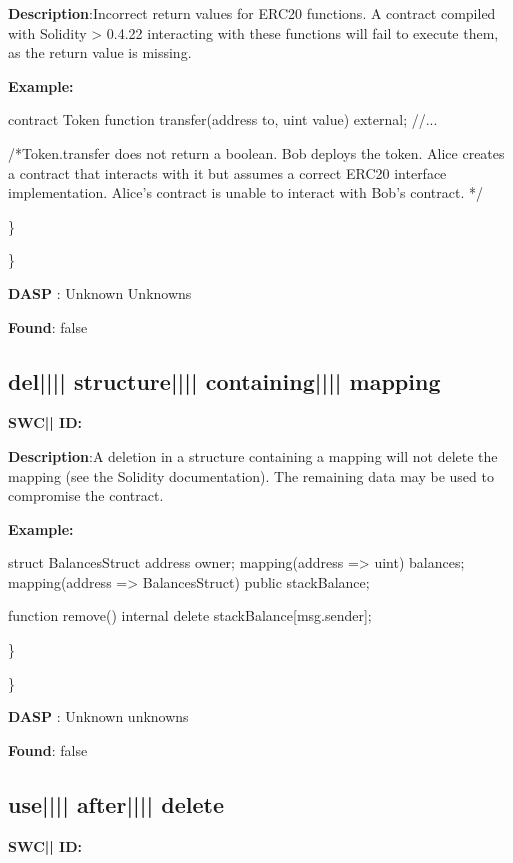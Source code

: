\documentclass{article}
\begin{document}
\textbf{Description}:Incorrect return values for ERC20 functions. A contract compiled with Solidity > 0.4.22 interacting with these functions will fail to execute them, as the return value is missing.


\textbf{Example:} 
\begin{ffcode} 

contract Token{
    function transfer(address to, uint value) external;
    //...
}

 /*Token.transfer does not return a boolean. Bob deploys the token. Alice creates a contract that interacts with it but assumes a correct ERC20 interface implementation. Alice's contract is unable to interact with Bob's contract. */ 

\end{ffcode} 
\} 

\} 

\textbf{DASP} : Unknown Unknowns

\textbf{Found}: false

\subsection{del{||\textunderscore|| }structure{||\textunderscore|| }containing{||\textunderscore|| }mapping} 
\textbf{SWC{|\textunderscore| }ID:} 

\textbf{Description}:A deletion in a structure containing a mapping will not delete the mapping (see the Solidity documentation). The remaining data may be used to compromise the contract.


\textbf{Example:} 
\begin{ffcode} 

struct BalancesStruct{
    address owner;
    mapping(address => uint) balances;
}
mapping(address => BalancesStruct) public stackBalance;

function remove() internal{
      delete stackBalance[msg.sender];
}

\end{ffcode} 
\} 

\} 

\textbf{DASP} : Unknown unknowns

\textbf{Found}: false

\subsection{use{||\textunderscore|| }after{||\textunderscore|| }delete} 
\textbf{SWC{|\textunderscore| }ID:} 
\end{document}
